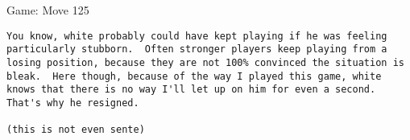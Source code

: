 \documentclass{article}
\begin{document}
\begin{section}{Game: Move 125}
\begin{center}
\begin{lstlisting}
You know, white probably could have kept playing if he was feeling particularly stubborn.  Often stronger players keep playing from a losing position, because they are not 100% convinced the situation is bleak.  Here though, because of the way I played this game, white knows that there is no way I'll let up on him for even a second.  That's why he resigned.

(this is not even sente)\end{lstlisting}
\end{center}
\end{section}
\end{document}
